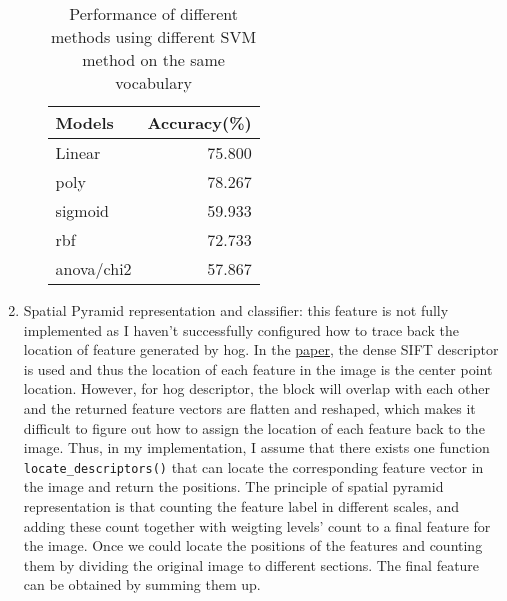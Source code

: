 \begin{enumerate}
\begin{itemize}
\begin{table}[h]
                        \centering
                        \begin{tabular}{lr}
                            \toprule
                            Models     & Accuracy(\%) \\
                            \midrule
                            Linear     & 75.800       \\
                            poly       & 78.267       \\
                            sigmoid    & 59.933       \\
                            rbf        & 72.733       \\
                            anova/chi2 & 57.867       \\
                            \bottomrule
                        \end{tabular}
                        \caption{Performance of different methods using different SVM method on the same vocabulary}
                        \label{svm}
                    \end{table}
          \end{itemize}
    \item Spatial Pyramid representation and classifier: this feature is not fully implemented as I haven't successfully configured how to trace back the location of feature generated by hog. In the \hyperlink{https://inc.ucsd.edu/~marni/Igert/Lazebnik_06.pdf}{paper}, the dense SIFT descriptor is used and thus the location of each feature in the image is the center point location. However, for hog descriptor, the block will overlap with each other and the returned feature vectors are flatten and reshaped, which makes it difficult to figure out how to assign the location of each feature back to the image. Thus, in my implementation, I assume that there exists one function \verb|locate_descriptors()| that can locate the corresponding feature vector in the image and return the positions.
          The principle of spatial pyramid representation is that counting the feature label in different scales, and adding these count together with weigting levels' count to a final feature for the image. Once we could locate the positions of the features and counting them by dividing the original image to different sections. The final feature can be obtained by summing them up.


\end{enumerate}
